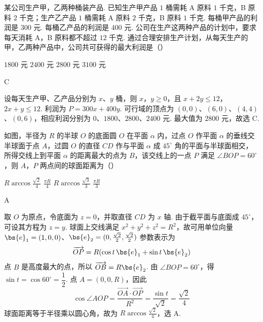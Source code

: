 \begin{problem}
某公司生产甲，乙两种桶装产品. 已知生产甲产品 \(1\) 桶需耗 A 原料 \(1\text{ 千克}\)，B 原料 \(2\text{ 千克}\)；生产乙产品 \(1\) 桶需耗 A 原料 \(2\text{ 千克}\)，B 原料 \(1\text{ 千克}\). 每桶甲产品的利润是 \(300\text{ 元}\). 每桶乙产品的利润是 \(400\text{ 元}\). 公司在生产这两种产品的计划中，要求每天消耗 A，B 原料都不超过 \(12\text{ 千克}\). 通过合理安排生产计划，从每天生产的甲，乙两种产品中，公司共可获得的最大利润是（\quad）

\choices
    {\(1800\text{ 元}\)}
    {\(2400\text{ 元}\)}
    {\(2800\text{ 元}\)}
    {\(3100\text{ 元}\)}
\end{problem}

\begin{answer}
C
\end{answer}

\begin{solution}
设每天生产甲、乙产品分别为 \(x\)、\(y\) 桶，则 \(x\)，\(y\geqslant0\)，且
\(x+2y\leqslant12\)，\(2x+y\leqslant12\).
利润为 \(P=300x+400y\). 可行域的顶点为
\((0,0)\)、\((6,0)\)、\((4,4)\)、\((0,6)\)，相应利润分别为
\(0\)、\(1800\)、\(2800\)、\(2400\) 元. 最大值为 \(2800\) 元，故选 C.
\end{solution}

\begin{problem}
如图，半径为 \(R\) 的半球 \(O\) 的底面圆 \(O\) 在平面 \(\alpha\) 内，过点 \(O\) 作平面 \(\alpha\) 的垂线交半球面于点 \(A\)，过圆 \(O\) 的直径 \(CD\) 作与平面 \(\alpha\) 成 \(45^{\circ}\) 角的平面与半球面相交，所得交线上到平面 \(\alpha\) 的距离最大的点为 \(B\)，该交线上的一点 \(P\) 满足 \(\angle BOP = 60^{\circ}\)，则 \(A\)，\(P\) 两点间的球面距离为（\quad）


\choices
    {\(R\arccos\frac{\sqrt{2}}{4}\)}
    {\(\frac{\pi R}{4}\)}
    {\(R\arccos \frac{\sqrt{3}}{3}\)}
    {\(\frac{\pi R}{3}\)}
\end{problem}

\begin{answer}
A
\end{answer}

\begin{solution}
取 \(O\) 为原点，令底面为 \(z=0\)，并取直径 \(CD\) 为 \(x\) 轴. 由于截平面与底面成 \(45^{\circ}\)，可设其方程为 \(z=y\).
球面上交线满足 \(x^2+y^2+z^2=R^2\)，故可用单位向量
\(\bs{e}_1=(1,0,0)\)、\(\bs{e}_2=(0,\frac{\sqrt2}{2},\frac{\sqrt2}{2})\) 参数表示为
\[
\overrightarrow{OP}=R(\cos t\,\bs{e}_1+\sin t\,\bs{e}_2)
\]
点 \(B\) 是高度最大的点，所以 \(\overrightarrow{OB}=R\bs{e}_2\). 由 \(\angle BOP=60^{\circ}\)，得
\(\sin t=\cos60^{\circ}=\dfrac12\). 点 \(A=(0,0,R)\)，因此
\[
\cos\angle AOP=\frac{\overrightarrow{OA}\cdot\overrightarrow{OP}}{R^2}
 =\frac{\sin t}{\sqrt2}=\frac{\sqrt2}{4}
\]
球面距离等于半径乘以圆心角，故为 \(R\arccos\frac{\sqrt2}{4}\)，选 A.
\end{solution}

